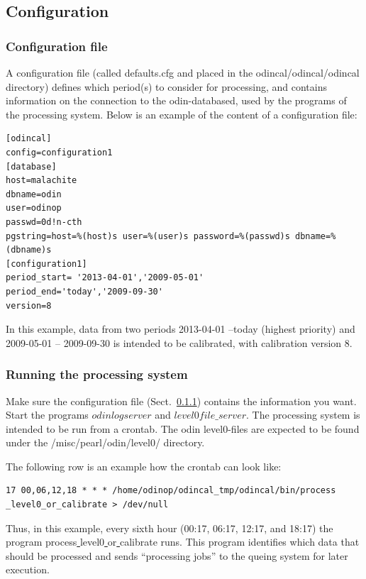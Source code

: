 \documentclass[12pt]{article}
\begin{document}
\subsection{Configuration}
\subsubsection{Configuration file}
\label{sec:config}
A configuration file (called defaults.cfg and placed
in the odincal/odincal/odincal directory) defines which period(s) to consider
for processing, and contains information on the connection
to the odin-databased, used by the programs of the processing system.
Below is an example of the content of a configuration file:
\begin{verbatim}
[odincal]
config=configuration1
[database]
host=malachite
dbname=odin
user=odinop
passwd=0d!n-cth
pgstring=host=%(host)s user=%(user)s password=%(passwd)s dbname=%(dbname)s
[configuration1]
period_start= '2013-04-01','2009-05-01'
period_end='today','2009-09-30'
version=8
\end{verbatim}
In this example, data from two periods 2013-04-01 --today (highest priority)
and 2009-05-01 -- 2009-09-30
is intended to be calibrated, with calibration version 8.

\subsubsection{Running the processing system}
Make sure the configuration file (Sect.~\ref{sec:config}) contains
the information you want.  
Start the programs \(odinlogserver\) and \(level0file\_server\).
The processing system is intended to be run from a crontab.
The odin level0-files are expected to be found
under the /misc/pearl/odin/level0/ directory.

The following row is an example how the crontab can look like: 
\begin{verbatim}
17 00,06,12,18 * * * /home/odinop/odincal_tmp/odincal/bin/process
_level0_or_calibrate > /dev/null
\end{verbatim}
Thus, in this example, every sixth hour (00:17, 06:17, 12:17, and 18:17)
the program process\underline{ }level0\underline{ }or\underline{ }calibrate
runs. This program identifies which data that should be processed
and sends ``processing jobs'' to the queing system for later execution.
\end{document}
